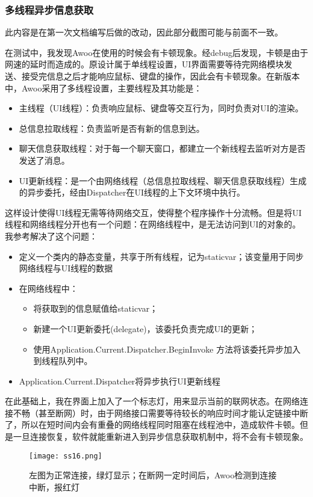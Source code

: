 \documentclass[a4paper,11pt]{article}
\begin{document}
        \subsubsection{\textbf{多线程异步信息获取}}
            此内容是在第一次文档编写后做的改动，因此部分截图可能与前面不一致。\par
            在测试中，我发现Awoo在使用的时候会有卡顿现象。经debug后发现，卡顿是由于网速的延时而造成的。原设计属于单线程设置，UI界面需要等待完网络模块发送、接受完信息之后才能响应鼠标、键盘的操作，因此会有卡顿现象。在新版本中，Awoo采用了多线程设置，主要线程及其功能是：\par
            \begin{itemize}
                \item 主线程（UI线程）：负责响应鼠标、键盘等交互行为，同时负责对UI的渲染。
                \item 总信息拉取线程：负责监听是否有新的信息到达。
                \item 聊天信息获取线程：对于每一个聊天窗口，都建立一个新线程去监听对方是否发送了消息。
                \item UI更新线程：是一个由网络线程（总信息拉取线程、聊天信息获取线程）生成的异步委托，经由Dispatcher在UI线程的上下文环境中执行。
            \end{itemize}
            这样设计使得UI线程无需等待网络交互，使得整个程序操作十分流畅。但是将UI线程和网络线程分开也有一个问题：在网络线程中，是无法访问到UI的对象的。我参考\cite{8}解决了这个问题：\par
            \begin{itemize}
                \item 定义一个类内的静态变量，共享于所有线程，记为staticvar；该变量用于同步网络线程与UI线程的数据
                \item 在网络线程中：
                    \begin{itemize}
                        \item 将获取到的信息赋值给staticvar；
                        \item 新建一个UI更新委托(delegate)，该委托负责完成UI的更新；
                        \item 使用Application.Current.Dispatcher.BeginInvoke 方法将该委托异步加入到线程队列中。
                    \end{itemize}
                \item Application.Current.Dispatcher将异步执行UI更新线程
            \end{itemize}
            在此基础上，我在界面上加入了一个标志灯，用来显示当前的联网状态。在网络连接不畅（甚至断网）时，由于网络接口需要等待较长的响应时间才能认定链接中断了，所以在短时间内会有重叠的网络线程同时阻塞在线程池中，造成软件卡顿。但是一旦连接恢复，软件就能重新进入到异步信息获取机制中，将不会有卡顿现象。
            \begin{figure}[H]
                \centering
                \texttt{[image: ss16.png]}
                \caption{左图为正常连接，绿灯显示；在断网一定时间后，Awoo检测到连接中断，报红灯}
            \end{figure}
\end{document}
